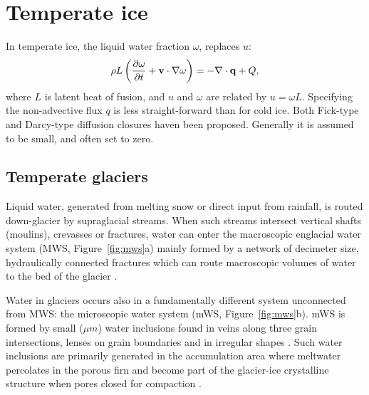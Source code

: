 \documentclass[parskip=half]{scrartcl}
\begin{document}
\section{Temperate ice}
\label{sec:temperate-ice}

In temperate ice, the liquid water fraction $\omega$, replaces $u$:
\begin{equation}
  \label{eq:water-content-equation} \rho L\left(\frac{\partial
\omega}{\partial t} + {\bf v}\cdot\nabla \omega\right) = -\nabla \cdot
{\bf q} + Q,
\end{equation} where $L$ is latent heat of fusion, and $u$ and
$\omega$ are related by $u=\omega L$. Specifying the non-advective
flux $q$ is less straight-forward than for cold ice. Both Fick-type
and Darcy-type diffusion closures haven been proposed. Generally it is
assumed to be small, and often set to zero.

\subsection{Temperate glaciers}
\label{sec:temperate-glaciers}

Liquid water, generated from melting snow or direct input from
rainfall, is routed down{-}glacier by supraglacial streams. When such
streams intersect vertical shafts (moulins), crevasses or fractures,
water can enter the macroscopic englacial water system (MWS,
Figure~\ref{fig:mws}a) mainly formed by a network of decimeter size,
hydraulically connected fractures which can route macroscopic volumes
of water to the bed of the glacier
\citep{FountainWalder1998,Fountain2005}.
%

Water in glaciers occurs also in a fundamentally different system
unconnected from MWS: the microscopic water system (mWS,
Figure~\ref{fig:mws}b). mWS is formed by small ($\mu m$) water
inclusions found in veins along three grain intersections, lenses on
grain boundaries and in irregular shapes
\citep{RaymondHarrison1975,Nye1989,Mader1992,FountainWalder1998}. Such
water inclusions are primarily generated in the accumulation area
where meltwater percolates in the porous firn and become part of the
glacier-ice crystalline structure when pores closed for compaction
\citep{Paterson1971,Lliboutry1976,Pettersson2004}.
\end{document}
